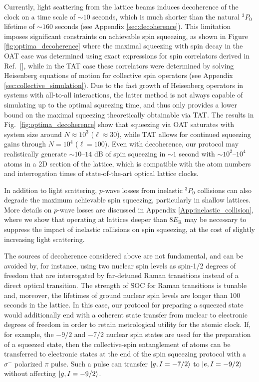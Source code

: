 \documentclass[aps,prx,superscriptaddress,notitlepage,twocolumn,longbibliography]{revtex4-1}
\renewcommand{\t}{\text} %
\renewcommand{\ket}{\Ket}
\begin{document}
Currently, light scattering from the lattice beams induces decoherence of the clock on a time scale of $\sim10$ seconds\cite{goban2018emergence, hutson2019engineering}, which is much shorter than the natural $^3P_0$ lifetime of $\sim160$ seconds (see Appendix \ref{sec:decoherence}).
This limitation imposes significant constraints on achievable spin squeezing, as shown in Figure \ref{fig:optima_decoherence} where the maximal squeezing with spin decay in the OAT case was determined using exact expressions for spin correlators derived in Ref.~[], while in the TAT case these correlators were determined by solving Heisenberg equations of motion for collective spin operators\cite{perlin2019shorttime} (see Appendix \ref{sec:collective_simulation}).
Due to the fast growth of Heisenberg operators in systems with all-to-all interactions, the latter method is not always capable of simulating up to the optimal squeezing time, and thus only provides a lower bound on the maximal squeezing theoretically obtainable via TAT.
The results in Fig.~\ref{fig:optima_decoherence} show that squeezing via OAT saturates with system size around $N\approx10^3$ ($\ell\approx30$), while TAT allows for continued squeezing gains through $N=10^4$ ($\ell=100$).
Even with decoherence, our protocol may realistically generate $\sim10$--$14$ dB of spin squeezing in $\sim1$ second with $\sim10^2$--$10^4$ atoms in a 2D section of the lattice, which is compatible with the atom numbers and interrogation times of state-of-the-art optical lattice clocks\cite{campbell2017fermidegenerate, marti2018imaging}.

In addition to light scattering, $p$-wave losses from inelastic ${}^3 P_0$ collisions\cite{martin2013quantum, Zhang2014, Bishof2011} can also degrade the maximum achievable spin squeezing, particularly in shallow lattices.
More details on $p$-wave losses are discussed in Appendix \ref{App:inelastic_collision}, where we show that operating at lattices deeper than $8 E_{\t{R}}$ may be necessary to suppress the impact of inelastic collisions on spin squeezing, at the cost of slightly increasing  light scattering.

The sources of decoherence considered above are not fundamental, and can be avoided by, for instance, using two nuclear spin levels as spin-1/2 degrees of freedom that are interrogated by far-detuned Raman transitions instead of a direct optical transition\cite{mancini2015observation}.
The strength of SOC for Raman transitions is tunable and, moreover, the lifetimes of ground nuclear spin levels are longer than 100 seconds in the lattice\cite{goban2018emergence}.
In this case, our protocol for preparing a squeezed state would additionally end with a coherent state transfer from nuclear to electronic degrees of freedom in order to retain metrological utility for the atomic clock.
If, for example, the $-9/2$ and $-7/2$ nuclear spin states are used for the preparation of a squeezed state, then the collective-spin entanglement of atoms can be transferred to electronic states at the end of the spin squeezing protocol with a $\sigma^-$ polarized $\pi$ pulse.
Such a pulse can transfer $\ket{g, I=-7/2}$ to $\ket{e, I=-9/2}$ without affecting $\ket{g, I=-9/2}$.
\end{document}
